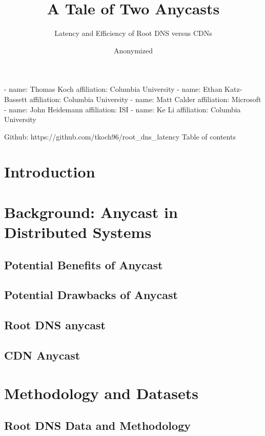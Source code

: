 \documentclass[sigconf,letterpaper,nonacm,10pt,anonymous]{acmart}
\title{A Tale of Two Anycasts}
\subtitle{Latency and Efficiency of Root DNS versus CDNs}
\author{Anonymized}
\date{}
\begin{document}
\maketitle


\iffalse
- name: Thomas Koch affiliation: Columbia University - name: Ethan
Katz-Bassett affiliation: Columbia University - name: Matt Calder
affiliation: Microsoft - name: John Heidemann affiliation: ISI - name:
Ke Li affiliation: Columbia University

Github: https://github.com/tkoch96/root\_dns\_latency Table of contents

\section{Introduction}\label{introduction}

\section{Background: Anycast in Distributed
Systems}\label{background-anycast-in-distributed-systems}

\subsection{Potential Benefits of
Anycast}\label{potential-benefits-of-anycast}

\subsection{Potential Drawbacks of
Anycast}\label{potential-drawbacks-of-anycast}

\subsection{Root DNS anycast}\label{root-dns-anycast}

\subsection{CDN Anycast}\label{cdn-anycast}

\section{Methodology and Datasets}\label{methodology-and-datasets}

\subsection{Root DNS Data and
Methodology}\label{root-dns-data-and-methodology}
\end{document}
